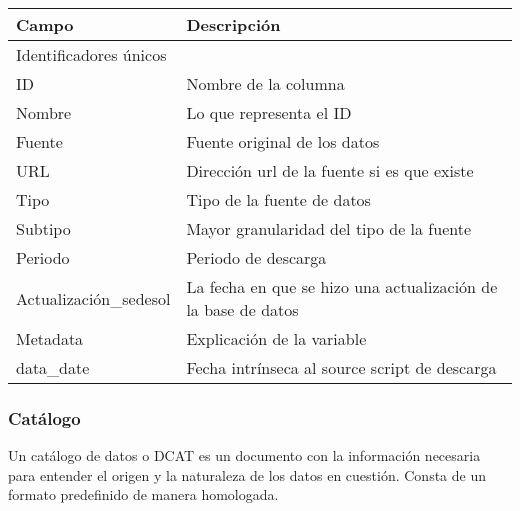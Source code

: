 \begin{longtable}{|p{8cm}|p{8cm}|}
    \hline
    \hline
    Campo  & Descripción\\
    \hline
    \multicolumn{2}{l}{Identificadores únicos}\\
    \hline
    ID & Nombre de la columna \\
    \hline
    Nombre & Lo que representa el ID \\
    \hline
    Fuente & Fuente original de los datos \\
    \hline
    URL & Dirección url de la fuente si es que existe \\
    \hline
    Tipo & Tipo de la fuente de datos \\
    \hline
    Subtipo & Mayor granularidad del tipo de la fuente \\
    \hline
    Periodo & Periodo de descarga \\
    \hline
    Actualización\_sedesol & La fecha en que se hizo una actualización de la base de datos\\
    \hline
    Metadata & Explicación de la variable \\
    \hline
    data\_date & Fecha intrínseca al source script de descarga \\
    \hline
\end{longtable}
\caption{Diccionario de datos}
\label{tab:diccionario}

\subsubsection{Catálogo}
Un catálogo de datos o DCAT es un documento con la información necesaria para entender el origen y la naturaleza de los datos en cuestión. Consta de un formato predefinido de manera homologada.
